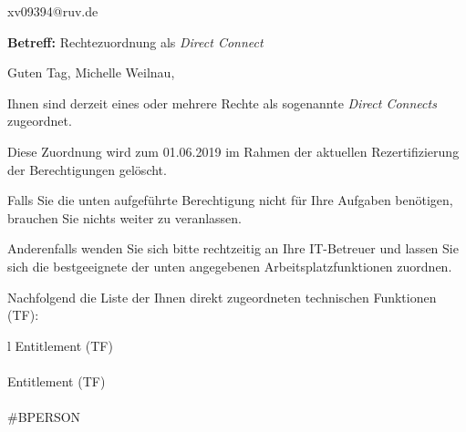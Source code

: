\documentclass[a4paper,landscape,12pt]{letter}
\begin{document}
\begin{letter}{xv09394@ruv.de\hfill \break}
\begin{normalsize}
	\opening{\textbf{Betreff:} Rechtezuordnung als \emph{Direct Connect}}
	\begin{normalsize} \hfill
	\end{normalsize}

	\begin{normalsize}
		Guten Tag, 
	Michelle Weilnau, \hfill \break
	\end{normalsize}
	\end{normalsize}
	
\begin{normalsize}
	Ihnen sind derzeit eines oder mehrere Rechte als sogenannte \emph{Direct Connects} zugeordnet.
	
	Diese Zuordnung wird zum 01.06.2019 im Rahmen der aktuellen Rezertifizierung der Berechtigungen gelöscht.
	
	Falls Sie die unten aufgeführte Berechtigung nicht für Ihre Aufgaben benötigen, 
	brauchen Sie nichts weiter zu veranlassen.
	
	Anderenfalls wenden Sie sich bitte rechtzeitig an Ihre IT-Betreuer 
	und lassen Sie sich die bestgeeignete der unten angegebenen Arbeitsplatzfunktionen zuordnen.
	\end{normalsize}
	
\begin{normalsize}
	Nachfolgend die Liste der Ihnen direkt zugeordneten technischen Funktionen (TF):

	\begin{longtable}{l}
		Entitlement (TF) \\ \hline
		\endfirsthead
		\\\hline
		Entitlement (TF) \\ \hline
		\endhead %
		\multicolumn{1}{r@{}}{Fortsetzung \ldots}\\
		\endfoot
		\hline
		\endlastfoot
	\#BPERSON\\
	\end{longtable}
	\end{normalsize}
	

\end{letter}
\end{document}
